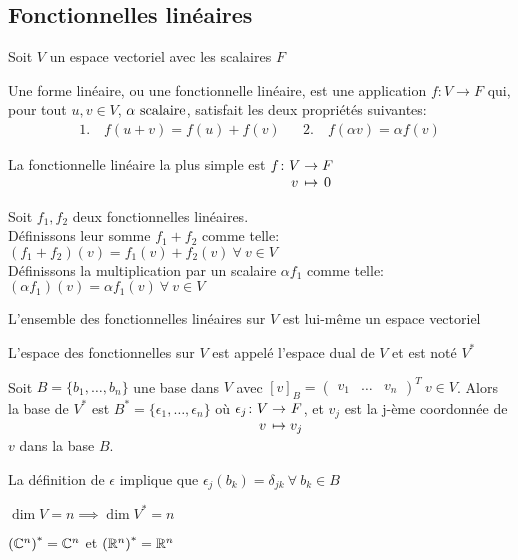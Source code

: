 
\subsection{Fonctionnelles linéaires}
Soit $V$ un espace vectoriel avec les scalaires $F$
\begin{definition}
    Une forme linéaire, ou une fonctionnelle linéaire, est une application
    $f\colon V \to F$ qui, pour tout $u, v \in V$, $\alpha \text{ scalaire}$,
    satisfait les deux propriétés suivantes:
    \begin{align*}
        1. \quad f(u + v) = f(u) + f(v)& &2. \quad f(\alpha v) = \alpha f(v)
    \end{align*}
\end{definition}
\begin{remark}
    La fonctionnelle linéaire la plus simple est $\myfunc{f}{V}{F}{v}{0}$
\end{remark}
\begin{definition}
    Soit $f_1, f_2$ deux fonctionnelles linéaires. \\
    Définissons leur somme $f_1 + f_2$ comme telle:
    $(f_1 + f_2)(v) = f_1(v) + f_2(v) \ \forall \ v \in V $ \\
    Définissons la multiplication par un scalaire $\alpha f_1$ comme telle: 
    $(\alpha f_1)(v) = \alpha f_1(v) \ \forall \ v \in V$
\end{definition}
\begin{lemma}
    L'ensemble des fonctionnelles linéaires sur $V$ est lui-même un espace vectoriel
\end{lemma}
\begin{definition}
    L'espace des fonctionnelles sur $V$ est appelé l'espace dual de $V$ et est noté $V^*$
\end{definition}
\begin{theorem}
    Soit $B = \{b_1, \dots, b_n\}$ une base dans $V$ avec $[v]_B = \begin{pmatrix}
        v_1 & \dots & v_n \end{pmatrix}^T \ v \in V$. 
    Alors la base de $V^*$ est $B^* = \{\epsilon_1, \dots, \epsilon_n\}$ où 
    $\myfunc{\epsilon_j}{V}{F}{v}{v_j}$, et $v_j$ est la j-ème coordonnée de $v$ dans la base $B$.
\end{theorem}
\begin{remark}
    La définition de $\epsilon$ implique que $\epsilon_j(b_k) = \delta_{jk} \ \forall \ b_k \in B$
\end{remark}
\begin{corollary}
    $\dim V = n \implies \dim V^* = n$
\end{corollary}
\begin{corollary}
    $\left(\mathbb{C}^n\right)^* = \mathbb{C}^n$ et $\left(\mathbb{R}^n\right)^* = \mathbb{R}^n$ 
\end{corollary}

